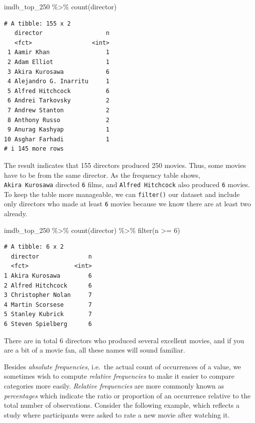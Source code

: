 \documentclass[
  letterpaper,
]{krantz}
\makeatletter
\newenvironment{Shaded}{\begin{snugshade}}{\end{snugshade}}
\newcommand{\DecValTok}[1]{\textcolor[rgb]{0.68,0.00,0.00}{#1}}
\newcommand{\FunctionTok}[1]{\textcolor[rgb]{0.28,0.35,0.67}{#1}}
\newcommand{\NormalTok}[1]{\textcolor[rgb]{0.00,0.23,0.31}{#1}}
\newcommand{\SpecialCharTok}[1]{\textcolor[rgb]{0.37,0.37,0.37}{#1}}
\newenvironment{kframe}{%
\medskip{}
\setlength{\fboxsep}{.8em}
 \def\at@end@of@kframe{}%
 \ifinner\ifhmode%
  \def\at@end@of@kframe{\end{minipage}}%
  \begin{minipage}{\columnwidth}%
 \fi\fi%
 \def\FrameCommand##1{\hskip\@totalleftmargin \hskip-\fboxsep
 \colorbox{shadecolor}{##1}\hskip-\fboxsep
     \hskip-\linewidth \hskip-\@totalleftmargin \hskip\columnwidth}%
 \MakeFramed {\advance\hsize-\width
   \@totalleftmargin\z@ \linewidth\hsize
   \@setminipage}}%
 {\par\unskip\endMakeFramed%
 \at@end@of@kframe}
\renewenvironment{Shaded}{\begin{kframe}}{\end{kframe}}
\makeatother
\begin{document}
\begin{Shaded}
\begin{Highlighting}[]
\NormalTok{imdb\_top\_250 }\SpecialCharTok{\%\textgreater{}\%} \FunctionTok{count}\NormalTok{(director)}
\end{Highlighting}
\end{Shaded}

\begin{verbatim}
# A tibble: 155 x 2
   director                  n
   <fct>                 <int>
 1 Aamir Khan                1
 2 Adam Elliot               1
 3 Akira Kurosawa            6
 4 Alejandro G. Inarritu     1
 5 Alfred Hitchcock          6
 6 Andrei Tarkovsky          2
 7 Andrew Stanton            2
 8 Anthony Russo             2
 9 Anurag Kashyap            1
10 Asghar Farhadi            1
# i 145 more rows
\end{verbatim}

The result indicates that 155 directors produced 250 movies. Thus, some
movies have to be from the same director. As the frequency table shows,
\texttt{Akira\ Kurosawa} directed \texttt{6} films, and
\texttt{Alfred\ Hitchcock} also produced \texttt{6} movies. To keep the
table more manageable, we can \texttt{filter()} our dataset and include
only directors who made at least \texttt{6} movies because we know there
are at least two already.

\begin{Shaded}
\begin{Highlighting}[]
\NormalTok{imdb\_top\_250 }\SpecialCharTok{\%\textgreater{}\%}
  \FunctionTok{count}\NormalTok{(director) }\SpecialCharTok{\%\textgreater{}\%}
  \FunctionTok{filter}\NormalTok{(n }\SpecialCharTok{\textgreater{}=} \DecValTok{6}\NormalTok{)}
\end{Highlighting}
\end{Shaded}

\begin{verbatim}
# A tibble: 6 x 2
  director              n
  <fct>             <int>
1 Akira Kurosawa        6
2 Alfred Hitchcock      6
3 Christopher Nolan     7
4 Martin Scorsese       7
5 Stanley Kubrick       7
6 Steven Spielberg      6
\end{verbatim}

There are in total 6 directors who produced several excellent movies,
and if you are a bit of a movie fan, all these names will sound
familiar.

Besides \emph{absolute frequencies}, i.e.~the actual count of
occurrences of a value, we sometimes wish to compute \emph{relative
frequencies} to make it easier to compare categories more easily.
\emph{Relative frequencies} are more commonly known as
\emph{percentages} which indicate the ratio or proportion of an
occurrence relative to the total number of observations. Consider the
following example, which reflects a study where participants were asked
to rate a new movie after watching it.
\end{document}
